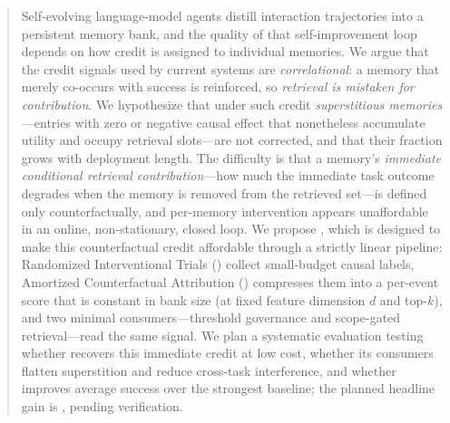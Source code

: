 \begin{abstract}
Self-evolving language-model agents distill interaction trajectories into a
persistent memory bank, and the quality of that self-improvement loop depends on
how credit is assigned to individual memories. We argue that the credit signals
used by current systems are \emph{correlational}: a memory that merely co-occurs
with success is reinforced, so \emph{retrieval is mistaken for contribution}.
We hypothesize that under such credit \emph{superstitious memories}---entries with
zero or negative causal effect that nonetheless accumulate utility and occupy
retrieval slots---are not corrected, and that their fraction grows with
deployment length. The difficulty is that a memory's \emph{immediate conditional
retrieval contribution}---how much the immediate task outcome degrades when the
memory is removed from the retrieved set---is defined only counterfactually, and
per-memory intervention appears unaffordable in an online, non-stationary, closed
loop. We propose \method{},
which is designed to make this counterfactual
credit affordable through a strictly linear pipeline: Randomized Interventional
Trials (\rit{}) collect small-budget causal labels, Amortized Counterfactual
Attribution (\aca{}) compresses them into a per-event score that is constant in
bank size (at fixed feature dimension $d$ and top-$k$), and two
minimal consumers---threshold governance and scope-gated retrieval---read the
same signal. We plan a systematic evaluation testing whether \aca{} recovers
this immediate credit at low cost, whether its consumers flatten superstition and
reduce cross-task interference, and whether \method{} improves average success
over the strongest baseline; the planned headline gain is
, pending verification.
\end{abstract}

